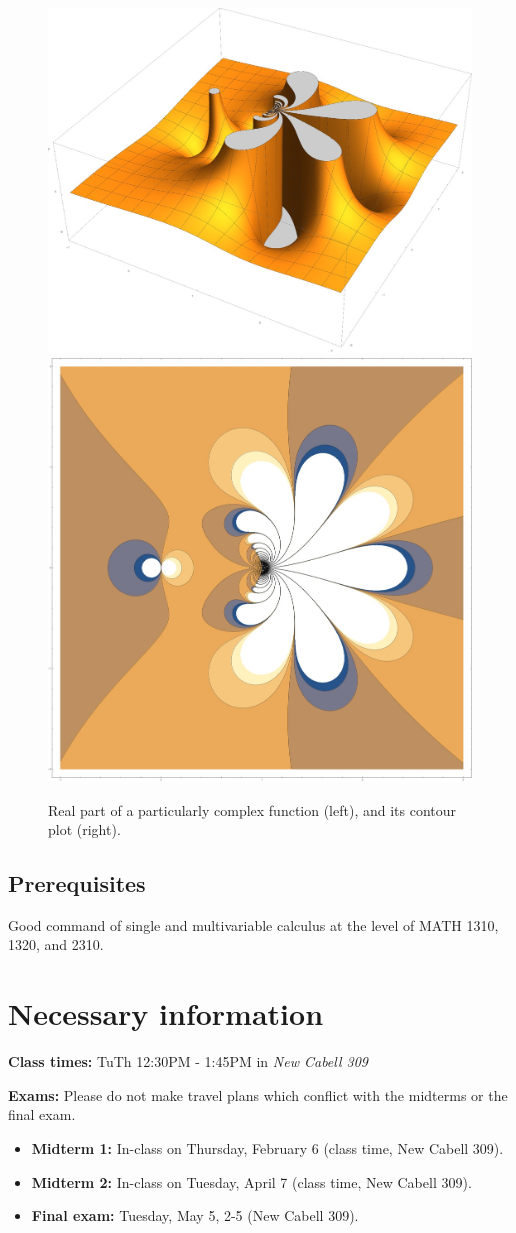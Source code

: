 \documentclass[oneside,11pt]{amsart}
\begin{document}
\begin{figure}[h]
	\includegraphics[height=.4\textwidth]{img/complex_f.jpg}
	\qquad 
	\includegraphics[height=.4\textwidth]{img/complex_f2.jpg}
	\caption{Real part of a particularly complex function (left), and 
	its contour plot (right).}
\end{figure}

\subsection*{Prerequisites}

Good command of single and multivariable calculus at the level of MATH 1310, 1320, and 2310.

\section{Necessary information}
\bigskip

\textbf{Class times:}   TuTh 12:30PM - 1:45PM in
\emph{New Cabell 309}

\medskip


\textbf{Exams:} Please do not make travel plans which conflict
with the midterms or the final exam.
\begin{itemize}
	\item \textbf{Midterm 1:} In-class on Thursday, February 6 (class time, New Cabell 309).
	\item \textbf{Midterm 2:} In-class on Tuesday, April 7 (class time, New Cabell 309).
	\item \textbf{Final exam:} Tuesday, May 5, 2-5 (New Cabell 309).
\end{itemize}
\end{document}
